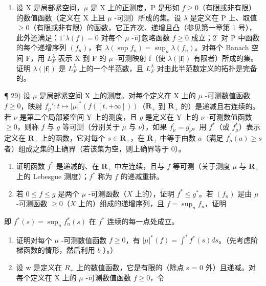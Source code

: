 \begin{enumerate}
\def\labelenumi{\arabic{enumi})}
\setcounter{enumi}{27}
\tightlist
\item
  设 X 是局部紧空间，\(\mu\) 是 X 上的正测度，P 是形如 \(f \geqslant 0\)（有限或非有限）的数值函数（定义在 X 上且 \(\mu\) -可测）所成的集。设 \(\lambda\) 是定义在 P 上、取值 \(\geqslant 0\)（有限或非有限）的函数，它正齐次、递增且凸（参见第一章第 1 号），此外还满足：\(1^{\circ} \lambda(f) = 0\) 对每个 \(\mu\) -可忽略函数 \(f \geqslant 0\) 成立；\(2^{\circ}\) 对 P 中函数的每个递增序列 \((f_{n})\)，有 \(\lambda(\sup f_{n}) = \sup_{n} \lambda(f_{n})\)。对每个 Banach 空间 F，用 \(L_{F}^{\lambda}\) 表示 X 到 F 的 \(\mu\) -可测映射 f（使 \(\lambda(|\mathbf{f}|)\) 有限者）所成的集。证明 \(\lambda(|\mathbf{f}|)\) 是 \(L_{F}^{\lambda}\) 上的一个半范数，且 \(L_{F}^{\lambda}\) 对由此半范数定义的拓扑是完备的。
\end{enumerate}

¶ 29) 设 \(\mu\) 是局部紧空间 X 上的测度。对每个定义在 X 上的 \(\mu\) -可测数值函数 \(f \geqslant 0\)，映射 \(f_{\mu}' : t \mapsto |\mu|^*(f([t, +\infty]))\)（\(\mathbf{R}_+\) 到 \(\overline{\mathbf{R}}_{+}\) 的）是递减且右连续的。若 \(\nu\) 是第二个局部紧空间 Y 上的测度，且 \(g\) 是定义在 Y 上的 \(\nu\) -可测数值函数 \(\geqslant 0\)，则称 \(f\) 与 \(g\) 等可测（分别关于 \(\mu\) 与 \(\nu\)），如果 \(f_{\mu}^{\prime} = g_{\nu}^{\prime}\)。用 \(f^{*}\)（或 \(f_{\mu}^{*}\)）表示定义在 \(\mathbf{R}_{+}\) 上的函数，它对每个 \(s \in \mathbf{R}_{+}\)，在 \(\overline{\mathbf{R}}_{+}\) 中等于由数 \(a\)（满足 \(f_{\mu}^{\prime}(a) \geqslant s\) 者）组成之集的上确界（若该集为空，则上确界等于 0）。

\begin{enumerate}
\def\labelenumi{\alph{enumi})}
\item
  证明函数 \(f^{*}\) 是递减的、在 \(\mathbf{R}_{+}\) 中左连续，且与 \(f\) 等可测（关于测度 \(\mu\) 与 \(\mathbf{R}_{+}\) 上的 Lebesgue 测度）；\(f^{*}\) 称为 \(f\) 的递减重排。
\item
  若 \(0 \leqslant f \leqslant g\) 是两个 \(\mu\) -可测函数（\(X\) 上的），证明 \(f^* \leqslant g^*\)。若 \((f_n)\) 是由 \(\mu\) -可测函数 \(\geqslant 0\)（\(X\) 上的）组成的递增序列，且 \(f = \sup_{n} f_n\)，证明
\end{enumerate}

即 \(f^{*}(s) = \sup_{n}f_{n}^{*}(s)\) 在 \(f^{*}\) 连续的每一点处成立。

\begin{enumerate}
\def\labelenumi{\alph{enumi})}
\setcounter{enumi}{2}
\item
  证明对每个 \(\mu\) -可测数值函数 \(f \geqslant 0\)，有 \(|\mu|^{*}(f) = \int^{*} f^{*}(s) ds\)。（先考虑阶梯函数的情形，然后利用 \(b\) ）。）
\item
  设 w 是定义在 \(R_{+}\) 上的数值函数，它是有限的（除点 s = 0 外）且递减。对每个定义在 X 上的 \(\mu\) -可测数值函数 \(f \geqslant 0\)，令
\end{enumerate}

